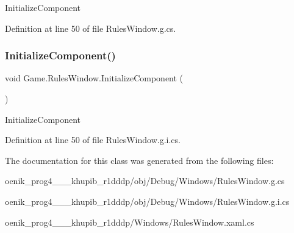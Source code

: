 Initialize\+Component 



Definition at line 50 of file Rules\+Window.\+g.\+cs.

\mbox{\label{class_game_1_1_rules_window_a1aec29ee1681cac885a5f65300b51e5f}} 
\subsubsection{\texorpdfstring{InitializeComponent()}{InitializeComponent()}\hspace{0.1cm}{\footnotesize\ttfamily [2/2]}}
{\footnotesize\ttfamily void Game.\+Rules\+Window.\+Initialize\+Component (\begin{DoxyParamCaption}{ }\end{DoxyParamCaption})}



Initialize\+Component 



Definition at line 50 of file Rules\+Window.\+g.\+i.\+cs.



The documentation for this class was generated from the following files\+:\begin{DoxyCompactItemize}
\item 
oenik\+\_\+prog4\+\_\+\_\+\_\+khupib\+\_\+r1dddp/obj/\+Debug/\+Windows/Rules\+Window.\+g.\+cs\item 
oenik\+\_\+prog4\+\_\+\_\+\_\+khupib\+\_\+r1dddp/obj/\+Debug/\+Windows/Rules\+Window.\+g.\+i.\+cs\item 
oenik\+\_\+prog4\+\_\+\_\+\_\+khupib\+\_\+r1dddp/\+Windows/Rules\+Window.\+xaml.\+cs\end{DoxyCompactItemize}
